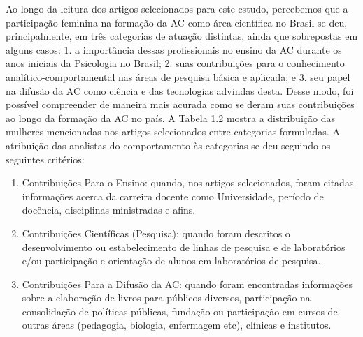 Ao longo da leitura dos artigos selecionados para este estudo, percebemos que a participação feminina na formação da AC como área científica no Brasil se deu, principalmente, em três categorias de atuação distintas, ainda que sobrepostas em alguns casos: 1. a importância dessas profissionais no ensino da AC durante os anos iniciais da Psicologia no Brasil; 2. suas contribuições para o conhecimento analítico-comportamental nas áreas de pesquisa básica e aplicada; e 3. seu papel na difusão da AC como ciência e das tecnologias advindas desta. Desse modo, foi possível compreender de maneira mais acurada como se deram suas contribuições ao longo da formação da AC no país. A Tabela 1.2 mostra a distribuição das mulheres mencionadas nos artigos selecionados entre categorias formuladas. A atribuição das analistas do comportamento às categorias se deu seguindo os seguintes critérios:

\begin{enumerate}[1. ]
\item Contribuições Para o Ensino: quando, nos artigos selecionados, foram citadas informações acerca da carreira docente como Universidade, período de docência, disciplinas ministradas e afins.

\item Contribuições Científicas (Pesquisa): quando foram descritos o desenvolvimento ou estabelecimento de linhas de pesquisa e de laboratórios e/ou participação e orientação de alunos em laboratórios de pesquisa.

\item Contribuições Para a Difusão da AC: quando foram encontradas informações sobre a elaboração de livros para públicos diversos, participação na consolidação de políticas públicas, fundação ou participação em cursos de outras áreas (pedagogia, biologia, enfermagem etc), clínicas e institutos.
\end{enumerate}

